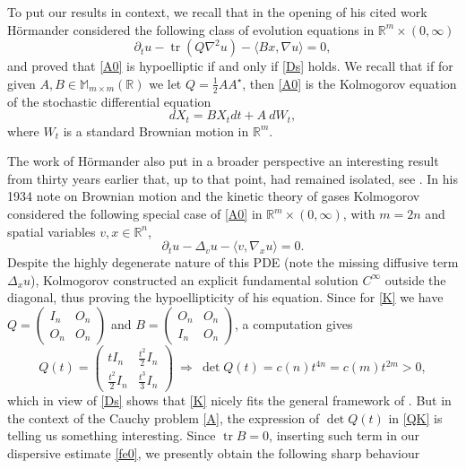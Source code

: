 \documentclass[11pt,a4paper]{amsart}
\def \R {\mathbb{R}}
\newcommand{\Rn}{\mathbb R^n}
\newcommand{\Rm}{\mathbb R^m}
\newcommand{\p}{\partial}
\numberwithin{equation}{section}
\newcommand{\I}{\mathscr I_{HL}}
\newcommand{\tr}{\operatorname{tr}}
\newcommand{\sa}{\langle}
\newcommand{\da}{\rangle}
\numberwithin{equation}{section}
\begin{document}
To put our results in context, we recall that in the opening of his cited work \cite{Ho} H\"ormander considered the following class of evolution equations in $\Rm\times (0,\infty)$ 
\begin{equation}\label{A0}
\p_t u - \operatorname{tr}(Q \nabla^2 u) -
\langle Bx,\nabla u\rangle   = 0,
\end{equation}
and proved that \eqref{A0} is hypoelliptic if and
only if \eqref{Ds} holds. We recall that if for given $A, B \in \mathbb M_{m\times m}(\R)$ we let $Q = \frac 12 A A^\star$, then \eqref{A0} is the Kolmogorov equation of the stochastic differential equation
\[
d X_t = B X_t dt + A\ d W_t,
\]
where $W_t$ is a standard Brownian motion in $\Rm$.

The work of H\"ormander also put in a broader perspective an interesting result from thirty years earlier that, up to that point, had remained isolated, see \cite{Str}. 
In his 1934 note \cite{Kol} on Brownian motion and the kinetic theory of gases Kolmogorov considered the following special case of \eqref{A0} in $\Rm\times (0,\infty)$, with $m = 2n$ and spatial variables $v, x\in \Rn$, 
\begin{equation}\label{K}
\p_t u- \Delta_v u - \sa v,\nabla_x u\da = 0.
\end{equation}
Despite the highly degenerate nature of this PDE (note the missing diffusive term $\Delta_x u$), Kolmogorov constructed an explicit fundamental solution $C^\infty$ outside the diagonal, thus proving the hypoellipticity of his equation. Since for \eqref{K} we have $Q = \begin{pmatrix} I_n & O_n\\ O_n & O_n\end{pmatrix}$ and $B = \begin{pmatrix} O_n & O_n\\I_n & O_n\end{pmatrix}$, a computation gives  
\begin{equation}\label{QK}
Q(t)= \begin{pmatrix} tI_n & \frac{t^2}2 I_n\\ \frac{t^2}2 I_n & \frac{t^3}3 I_n\end{pmatrix}\  \Longrightarrow\ \det Q(t) = c(n) t^{4n} = c(m) t^{2m}>0,
\end{equation}
which in view of \eqref{Ds} shows that \eqref{K} nicely fits the general framework of \cite{Ho}.
But in the context of the Cauchy problem \eqref{A}, the expression of $\det Q(t)$ in \eqref{QK} is telling us something interesting. Since  $\tr B = 0$, inserting such term in our dispersive estimate \eqref{fe0}, we presently obtain the following sharp behaviour
\end{document}
